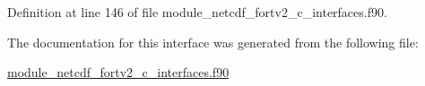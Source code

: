 Definition at line 146 of file module\+\_\+netcdf\+\_\+fortv2\+\_\+c\+\_\+interfaces.\+f90.



The documentation for this interface was generated from the following file\+:\begin{DoxyCompactItemize}
\item 
\hyperlink{module__netcdf__fortv2__c__interfaces_8f90}{module\+\_\+netcdf\+\_\+fortv2\+\_\+c\+\_\+interfaces.\+f90}\end{DoxyCompactItemize}
